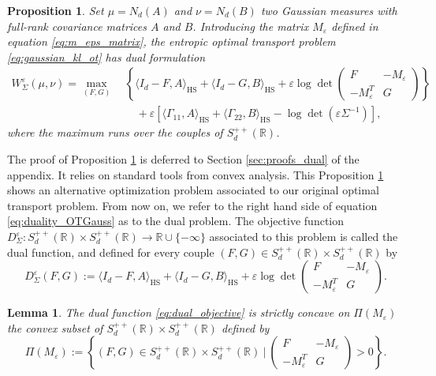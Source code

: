 \documentclass[]{article}
\DeclareMathOperator{\HS}{HS}
\numberwithin{equation}{section}
\theoremstyle{plain}
\newtheorem{prop}{Proposition}[section]
\newtheorem{lem}{Lemma}[section]
\begin{document}
\begin{prop}\label{prop:duality_OTGauss}
    Set $\mu = N_d(A)$ and $\nu = N_d(B)$ two Gaussian measures with full-rank covariance matrices $A$ and $B$. Introducing the matrix $M_\varepsilon$ defined in equation \eqref{eq:m_eps_matrix}, the entropic optimal transport problem \eqref{eq:gaussian_kl_ot} has dual formulation 
    \begin{align}\label{eq:duality_OTGauss}
        W_\Sigma^\varepsilon(\mu, \nu) =  \max_{(F,G)}  ~& \left\{\langle I_d-F, A \rangle_{\HS}  + \langle I_d -G, B \rangle_{\HS} 
          + \varepsilon \log  \det \begin{pmatrix}
         F    & -M_{\varepsilon}    \\
    -M_{\varepsilon}^T&    G 
    \end{pmatrix} \right\}\\ & \quad +  \varepsilon \left[ \langle \Gamma_{11}, A \rangle_{\HS} + \langle \Gamma_{22}, B \rangle_{\HS} -\log \det(\varepsilon \Sigma^{-1})\right], \nonumber
    \end{align}
where the maximum runs over the couples of $S_{d}^{++}(\mathbb{R})$.
\end{prop}
The proof of Proposition \ref{prop:duality_OTGauss} is deferred to Section \ref{sec:proofs_dual} of the appendix. It relies on standard tools from convex analysis. This Proposition \ref{prop:duality_OTGauss} shows an alternative optimization problem associated to our original optimal transport problem. From now on, we refer to the right hand side of equation \eqref{eq:duality_OTGauss} as to the dual problem.  The objective function $D_\Sigma^\varepsilon : S_d^{++}(\mathbb{R}) \times S_d^{++}(\mathbb{R}) \rightarrow \mathbb{R} \cup \{-\infty\}$ associated to this problem is called the dual function, and defined for every couple $(F,G) \in S_d^{++}(\mathbb{R}) \times S_d^{++}(\mathbb{R})$ by 
\begin{equation}\label{eq:dual_objective}
    D_{\Sigma}^\varepsilon(F,G) :=\langle I_d - F, A \rangle_{\HS} + \langle I_d-G, B \rangle_{\HS} +   \varepsilon \log  \det \begin{pmatrix}
      F   & -M_{\varepsilon}    \\
      -M_{\varepsilon} ^T  &    G 
    \end{pmatrix}.
\end{equation}


\begin{lem}The dual function \eqref{eq:dual_objective} is strictly concave on $\Pi(M_\varepsilon)$ the convex subset of $S_{d}^{++}(\mathbb{R}) \times S_{d}^{++}(\mathbb{R})$ defined by 
	\begin{equation}\label{eq:constraint_dual}
		\Pi(M_\varepsilon) := \left\{ (F, G) \in S_{d}^{++}(\mathbb{R}) \times S_{d}^{++}(\mathbb{R})~|~ \begin{pmatrix}
			F & -M_\varepsilon \\
			-M_\varepsilon^T & G
		\end{pmatrix} > 0 \right\}.
	\end{equation}
\end{lem}
\end{document}
